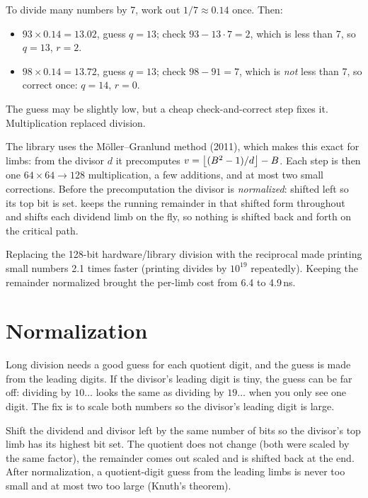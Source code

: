 \begin{another}
To divide many numbers by 7, work out $1/7 \approx 0.14$ once. Then:
\begin{itemize}
  \item $93 \times 0.14 = 13.02$, guess $q = 13$; check $93 - 13 \cdot 7 = 2$, which is
        less than 7, so $q = 13$, $r = 2$.
  \item $98 \times 0.14 = 13.72$, guess $q = 13$; check $98 - 91 = 7$, which is \emph{not} less
        than 7, so correct once: $q = 14$, $r = 0$.
\end{itemize}
The guess may be slightly low, but a cheap check-and-correct step fixes it. Multiplication
replaced division.
\end{another}

The library uses the Möller--Granlund method (2011), which makes this exact for limbs: from
the divisor $d$ it precomputes $v = \left\lfloor (B^2 - 1)/d \right\rfloor - B$. Each step is then one
$64 \times 64 \to 128$ multiplication, a few additions, and at most two small corrections.
Before the precomputation the divisor is \emph{normalized}: shifted left so its top bit is set.
 keeps the running remainder in that shifted form throughout and
shifts each dividend limb on the fly, so nothing is shifted back and forth on the critical
path.

\begin{perfnote}
Replacing the 128-bit hardware/library division with the reciprocal made printing small
numbers 2.1 times faster (printing divides by $10^{19}$ repeatedly). Keeping the remainder
normalized brought the per-limb cost from 6.4 to 4.9\,ns.
\end{perfnote}

\section{Normalization}
\label{sec:normalize}

Long division needs a good guess for each quotient digit, and the guess is made from the
leading digits. If the divisor's leading digit is tiny, the guess can be far off: dividing by
$10\ldots$ looks the same as dividing by $19\ldots$ when you only see one digit. The fix is to
scale both numbers so the divisor's leading digit is large.

\begin{keyidea}
Shift the dividend and divisor left by the same number of bits so the divisor's top limb has
its highest bit set. The quotient does not change (both were scaled by the same factor), the
remainder comes out scaled and is shifted back at the end. After normalization, a
quotient-digit guess from the leading limbs is never too small and at most two too large
(Knuth's theorem).
\end{keyidea}

